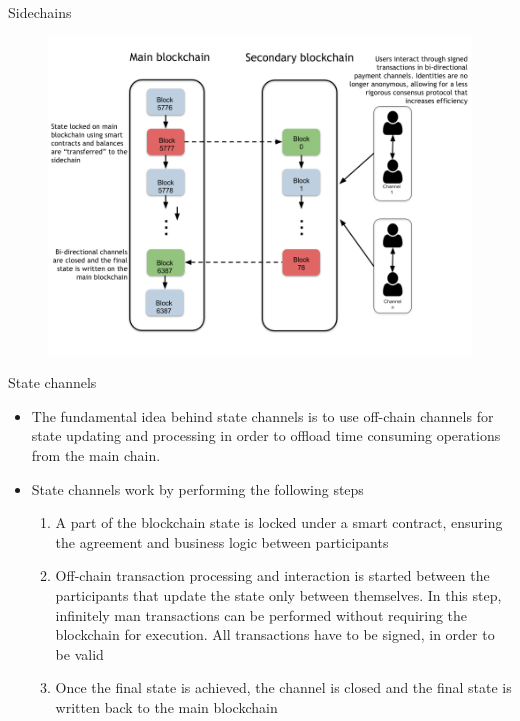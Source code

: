 \documentclass[10pt]{beamer}
\begin{document}

\begin{frame}{Sidechains}
	\begin{figure}[]
		\centering
		\includegraphics  [scale=0.3]{Images/sidechain}
	\end{figure}
\end{frame}


\begin{frame}{State channels}
	\begin{itemize}
		\item The fundamental idea behind state channels is to use off-chain channels for state updating and processing in order to offload time consuming operations from the main chain.
		\item State channels work by performing the following steps
		\begin{enumerate}
			\item A part of the blockchain state is locked under a smart contract, ensuring the agreement and business logic between participants
			\item Off-chain transaction processing and interaction is started between the participants that update the state only between themselves. In this step, infinitely man transactions can be performed without requiring the blockchain for execution. All transactions have to be signed, in order to be valid
			\item Once the final state is achieved, the channel is closed and the final state is written back to the main blockchain
		\end{enumerate}
	\end{itemize}
\end{frame}
\end{document}
